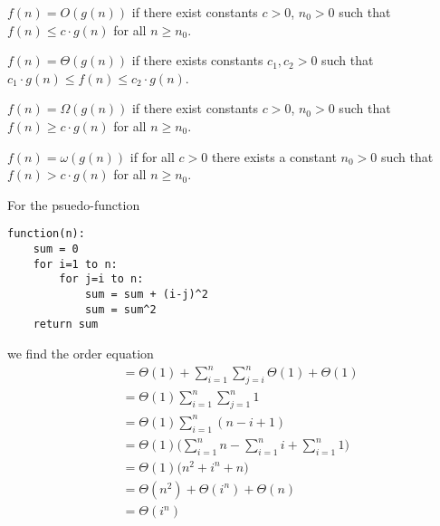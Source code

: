 \documentclass[12pt]{article}
\begin{document}
\begin{definition}[$O$]
$f(n) = O(g(n))$ if there exist constants $c > 0$, $n_0 > 0$ such that $f(n) \leq c \cdot g(n)$ for all $n \geq n_0$.
\end{definition}

\begin{definition}[$\Theta$]
$f(n) = \Theta(g(n))$ if there exists constants $c_1, c_2 > 0$ such that $c_1 \cdot g(n) \leq f(n) \leq c_2 \cdot g(n)$.
\end{definition}

\begin{definition}[$\Omega$]
$f(n) = \Omega(g(n))$ if there exist constants $c > 0$, $n_0 > 0$ such that $f(n) \geq c \cdot g(n)$ for all $n \geq n_0$.
\end{definition}

\begin{definition}[$\omega$]
$f(n) = \omega(g(n))$ if for all $c > 0$ there exists a constant $n_0 > 0$ such that $f(n) > c \cdot g(n)$ for all $n \geq n_0$.
\end{definition}

\begin{example}
For the psuedo-function
\begin{verbatim}
function(n):
    sum = 0
    for i=1 to n:
        for j=i to n:
            sum = sum + (i-j)^2
            sum = sum^2
    return sum
\end{verbatim}
we find the order equation
\begin{align*}
&= \Theta(1) + \sum_{i=1}^n \sum_{j=i}^n \Theta(1) + \Theta(1)\\
&= \Theta(1) \sum_{i=1}^n \sum_{j=1}^n 1\\
&= \Theta(1) \sum_{i=1}^n (n-i+1)\\
&= \Theta(1) \bigg( \sum_{i=1}^n n - \sum_{i=1}^n i + \sum_{i=1}^n 1 \bigg)\\
&= \Theta(1) \bigl( n^2 + i^n + n \bigl)\\
&= \Theta(n^2) + \Theta(i^n) + \Theta(n)\\
&= \Theta(i^n)
\end{align*}
\end{example}
\end{document}
